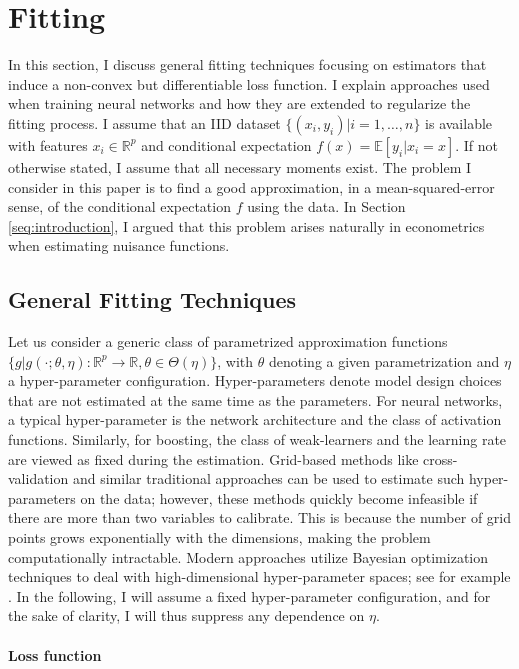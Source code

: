 \section{Fitting}
\label{seq:fitting}

In this section, I discuss general fitting techniques focusing on estimators that induce
a non-convex but differentiable loss function. I explain approaches used when training
neural networks and how they are extended to regularize the fitting process. I assume
that an IID dataset $\{(x_i, y_i) | i = 1, \dots, n\}$ is available with features $x_i
\in \mathbb{R}^p$ and conditional expectation $f(x) = \mathbb{E}[y_i | x_i = x]$. If not
otherwise stated, I assume that all necessary moments exist. The problem I consider in
this paper is to find a good approximation, in a mean-squared-error sense, of the
conditional expectation $f$ using the data. In Section \ref{seq:introduction}, I argued
that this problem arises naturally in econometrics when estimating nuisance functions.

\subsection{General Fitting Techniques}

Let us consider a generic class of parametrized approximation functions $\{g | g(\cdot;
\theta, \eta) : \mathbb{R}^p \to \mathbb{R}, \theta \in \Theta(\eta)\}$, with $\theta$
denoting a given parametrization and $\eta$ a hyper-parameter configuration.
Hyper-parameters denote model design choices that are not estimated at the same time as
the parameters. For neural networks, a typical hyper-parameter is the network
architecture and the class of activation functions. Similarly, for boosting, the class
of weak-learners and the learning rate are viewed as fixed during the estimation.
Grid-based methods like cross-validation and similar traditional approaches can be used
to estimate such hyper-parameters on the data; however, these methods quickly become
infeasible if there are more than two variables to calibrate. This is because the number
of grid points grows exponentially with the dimensions, making the problem
computationally intractable. Modern approaches utilize Bayesian optimization techniques
to deal with high-dimensional hyper-parameter spaces; see for example \cite{Snoek.2012}.
In the following, I will assume a fixed hyper-parameter configuration, and for the sake
of clarity, I will thus suppress any dependence on $\eta$.

\paragraph{Loss function}

